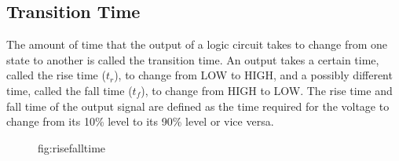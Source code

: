 \subsection{Transition Time}

The amount of time that the output of a logic circuit
takes to change from one
state to another is called the transition time.
An output takes a certain time, called the rise time
($t_r$), to change from LOW to HIGH, and a
possibly different time, called the fall
time ($t_f$), to change from HIGH to LOW.
The rise time and fall time of the output signal are defined as the time
required for the voltage to change from its 10\% level to its 90\% level
or vice versa.

\begin{figure}
    \centering
    \label{Rise and Fall Time}
    \caption{fig:risefalltime}
\end{figure}